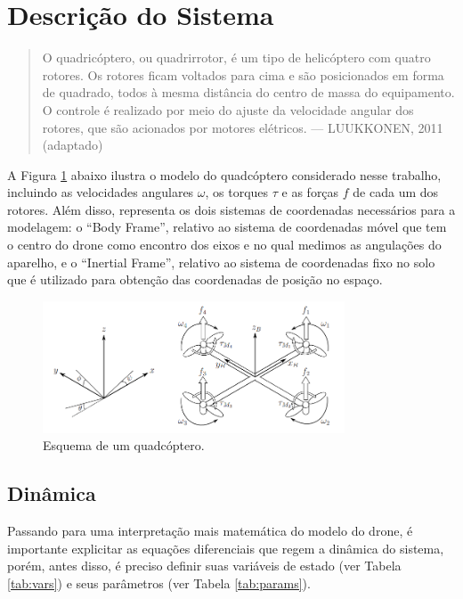 \section{Descrição do Sistema}
\begin{quote}
    O quadricóptero, ou quadrirrotor, é um tipo de helicóptero com quatro rotores. Os rotores ficam 
    voltados para cima e são posicionados em forma de quadrado, todos à mesma distância do centro de 
    massa do equipamento. O controle é realizado por meio do ajuste da velocidade angular dos rotores, 
    que são acionados por motores elétricos. — LUUKKONEN, 2011 \cite{luukkonen} (adaptado)
\end{quote}

A Figura \ref{fig:modelo} abaixo ilustra o modelo do quadcóptero considerado nesse trabalho, incluindo 
as velocidades angulares $\omega$, os torques $\tau$ e as forças $f$ de cada um dos rotores. Além disso, 
representa os dois sistemas de coordenadas necessários para a modelagem: o ``Body Frame'', relativo ao 
sistema de coordenadas móvel que tem o centro do drone como encontro dos eixos e no qual medimos as angulações 
do aparelho, e o ``Inertial Frame'', relativo ao sistema de coordenadas fixo no solo que é utilizado para 
obtenção das coordenadas de posição no espaço.

\begin{figure}[h!]
    \centering
    \includegraphics[width=0.8\textwidth]{figs/desenho_drone.png}
    \caption{Esquema de um quadcóptero. \cite{luukkonen}}
    \label{fig:modelo}
\end{figure}

\subsection{Dinâmica}

Passando para uma interpretação mais matemática do modelo do drone, é importante explicitar as equações diferenciais 
que regem a dinâmica do sistema, porém, antes disso, é preciso definir suas variáveis de estado (ver Tabela \ref{tab:vars}) 
e seus parâmetros (ver Tabela \ref{tab:params}).

